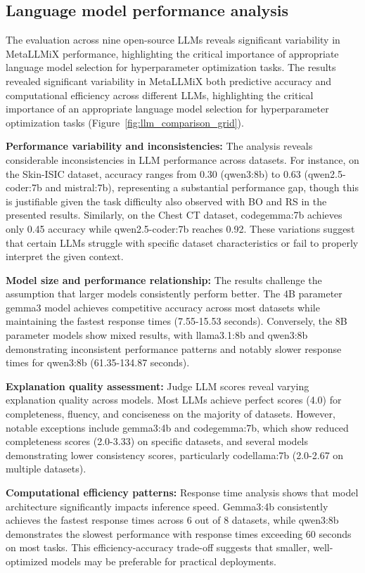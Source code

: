 \documentclass{article}
\begin{document}
\subsection{Language model performance analysis}
The evaluation across nine open-source LLMs reveals significant variability in MetaLLMiX performance, highlighting the critical importance of appropriate language model selection for hyperparameter optimization tasks. The results revealed significant variability in MetaLLMiX both predictive accuracy and computational efficiency across different LLMs, highlighting the critical importance of an appropriate language model selection for hyperparameter optimization tasks (Figure~\ref{fig:llm_comparison_grid}).


\textbf{Performance variability and inconsistencies:} The analysis reveals considerable inconsistencies in LLM performance across datasets. For instance, on the Skin-ISIC dataset, accuracy ranges from 0.30 (qwen3:8b) to 0.63 (qwen2.5-coder:7b and mistral:7b), representing a substantial performance gap, though this is justifiable given the task difficulty also observed with BO and RS in the presented results. Similarly, on the Chest CT dataset, codegemma:7b achieves only 0.45 accuracy while qwen2.5-coder:7b reaches 0.92. These variations suggest that certain LLMs struggle with specific dataset characteristics or fail to properly interpret the given context.

\textbf{Model size and performance relationship:} The results challenge the assumption that larger models consistently perform better. The 4B parameter gemma3 model achieves competitive accuracy across most datasets while maintaining the fastest response times (7.55-15.53 seconds). Conversely, the 8B parameter models show mixed results, with llama3.1:8b and qwen3:8b demonstrating inconsistent performance patterns and notably slower response times for qwen3:8b (61.35-134.87 seconds).

\textbf{Explanation quality assessment:} Judge LLM scores reveal varying explanation quality across models. Most LLMs achieve perfect scores (4.0) for completeness, fluency, and conciseness on the majority of datasets. However, notable exceptions include gemma3:4b and codegemma:7b, which show reduced completeness scores (2.0-3.33) on specific datasets, and several models demonstrating lower consistency scores, particularly codellama:7b (2.0-2.67 on multiple datasets).

\textbf{Computational efficiency patterns:} Response time analysis shows that model architecture significantly impacts inference speed. Gemma3:4b consistently achieves the fastest response times across 6 out of 8 datasets, while qwen3:8b demonstrates the slowest performance with response times exceeding 60 seconds on most tasks. This efficiency-accuracy trade-off suggests that smaller, well-optimized models may be preferable for practical deployments.
\end{document}
